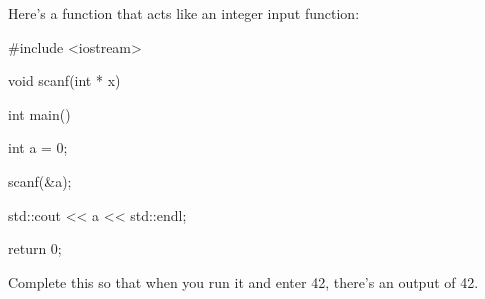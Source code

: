 Here's a function that acts like an integer input function:

\begin{consolethree}[escapeinside=||]

#include <iostream>



void scanf(int * x)

{

}



int main()

{

    int a = 0;

    scanf(&a);

    std::cout << a << std::endl;

    return 0;

}

\end{consolethree}

Complete this so that when you run it and enter 42, there's an output of 42.


